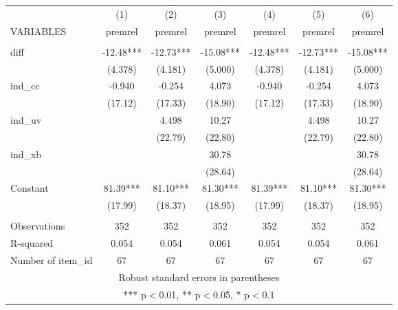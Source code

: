 \documentclass[]{article}
\begin{document}
\begin{tabular}{lcccccc} \hline
 & (1) & (2) & (3) & (4) & (5) & (6) \\
VARIABLES & premrel & premrel & premrel & premrel & premrel & premrel \\ \hline
 &  &  &  &  &  &  \\
diff & -12.48*** & -12.73*** & -15.08*** & -12.48*** & -12.73*** & -15.08*** \\
 & (4.378) & (4.181) & (5.000) & (4.378) & (4.181) & (5.000) \\
ind\_cc & -0.940 & -0.254 & 4.073 & -0.940 & -0.254 & 4.073 \\
 & (17.12) & (17.33) & (18.90) & (17.12) & (17.33) & (18.90) \\
ind\_uv &  & 4.498 & 10.27 &  & 4.498 & 10.27 \\
 &  & (22.79) & (22.80) &  & (22.79) & (22.80) \\
ind\_xb &  &  & 30.78 &  &  & 30.78 \\
 &  &  & (28.64) &  &  & (28.64) \\
Constant & 81.39*** & 81.10*** & 81.30*** & 81.39*** & 81.10*** & 81.30*** \\
 & (17.99) & (18.37) & (18.95) & (17.99) & (18.37) & (18.95) \\
 &  &  &  &  &  &  \\
Observations & 352 & 352 & 352 & 352 & 352 & 352 \\
R-squared & 0.054 & 0.054 & 0.061 & 0.054 & 0.054 & 0.061 \\
 Number of item\_id & 67 & 67 & 67 & 67 & 67 & 67 \\ \hline
\multicolumn{7}{c}{ Robust standard errors in parentheses} \\
\multicolumn{7}{c}{ *** p$<$0.01, ** p$<$0.05, * p$<$0.1} \\
\end{tabular}
\end{document}
